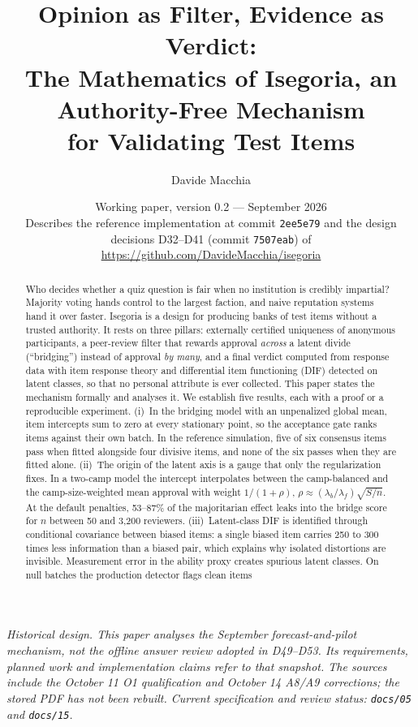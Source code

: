 \documentclass[11pt,a4paper]{article}
\title{Opinion as Filter, Evidence as Verdict:\\
The Mathematics of Isegoria, an Authority-Free Mechanism\\ for Validating Test Items}
\author{Davide Macchia}
\date{Working paper, version 0.2 --- September 2026\\[0.3em]
\small Describes the reference implementation at commit \texttt{2ee5e79} and the design
decisions D32--D41 (commit \texttt{7507eab}) of \url{https://github.com/DavideMacchia/isegoria}}
\begin{document}
\maketitle

\noindent\textit{Historical design. This paper analyses the September forecast-and-pilot
mechanism, not the offline answer review adopted in D49--D53. Its requirements, planned
work and implementation claims refer to that snapshot. The sources include the October
11 O1 qualification and October 14 A8/A9 corrections; the stored PDF has not been rebuilt.
Current specification and review status: \texttt{docs/05} and \texttt{docs/15}.}

\begin{abstract}
\noindent
Who decides whether a quiz question is fair when no institution is credibly impartial?
Majority voting hands control to the largest faction, and naive reputation systems hand it
over faster. Isegoria is a design for producing banks of test items without a trusted
authority. It rests on three pillars: externally certified uniqueness of anonymous
participants, a peer-review filter that rewards approval \emph{across} a latent divide
(``bridging'') instead of approval \emph{by many}, and a final verdict computed from
response data with item response theory and differential item functioning (DIF) detected on
latent classes, so that no personal attribute is ever collected. This paper states the
mechanism formally and analyses it. We establish five results, each with a proof or a
reproducible experiment.
(i)~In the bridging model with an unpenalized global mean, item intercepts sum to zero at
every stationary point, so the acceptance gate ranks items against their own batch. In the
reference simulation, five of six consensus items pass when fitted alongside four divisive
items, and none of the six passes when they are fitted alone.
(ii)~The origin of the latent axis is a gauge that only the regularization fixes. In a
two-camp model the intercept interpolates between the camp-balanced and the camp-size-weighted
mean approval with weight $1/(1+\rho)$, $\rho\approx(\lambda_b/\lambda_f)\sqrt{S/n}$. At the
default penalties, 53--87\% of the majoritarian effect leaks into the bridge score for $n$
between 50 and 3{,}200 reviewers.
(iii)~Latent-class DIF is identified through conditional covariance between biased items:
a single biased item carries 250 to 300 times less information than a biased pair, which
explains why isolated distortions are invisible. Measurement error in the ability proxy
creates spurious latent classes. On null batches the production detector flags clean items

\end{abstract}
\end{document}

